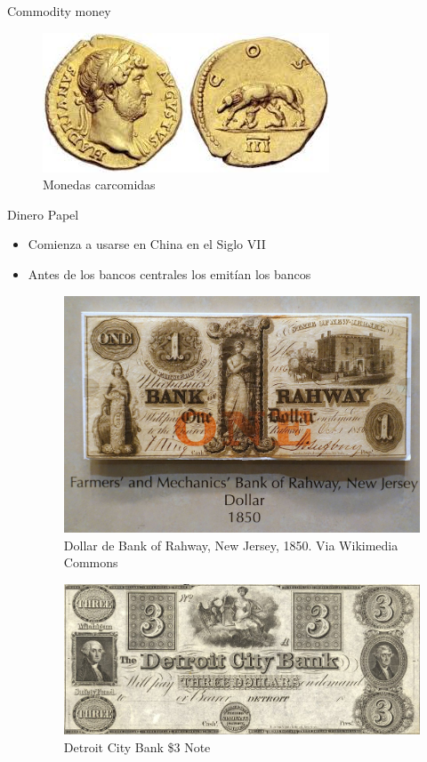 \documentclass{beamer}
\begin{document}
\begin{frame}{Commodity money}
            \begin{figure} [H]   
  \centering
  \includegraphics[width=.8\textwidth]{../Figures/C32.1.jpg}
      \caption{Monedas carcomidas}
\end{figure}
\end{frame}

\begin{frame}{Dinero Papel}
    \begin{itemize}
        \item Comienza a usarse en China en el Siglo VII
        \item Antes de los bancos centrales los emitían los bancos 
        
\begin{figure} [H]   
  \centering
  \includegraphics[width=.35\textwidth]{../Figures/C32.2.jpg}
      \caption{Dollar de Bank of Rahway, New Jersey, 1850. Via Wikimedia Commons}
  \label{fig:C32.2}
\end{figure}

\begin{figure} [H]   
  \centering
  \includegraphics[width=.35\textwidth]{../Figures/C32.3.jpeg}
      \caption{Detroit City Bank \$3 Note}
  \label{fig:C32.3}
\end{figure}
\end{itemize}
\end{frame}
        
\end{document}
